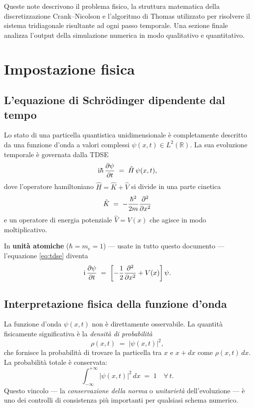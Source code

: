 \documentclass[12pt, a4paper]{article}
\newcommand{\ii}{\mathrm{i}}          %
\newcommand{\CN}{Crank--Nicolson}
\newcommand{\Htop}{\hat{H}}
\newcommand{\Ktop}{\hat{K}}
\newcommand{\Vtop}{\hat{V}}
\begin{document}
Queste note descrivono il problema fisico, la struttura matematica della
discretizzazione \CN{} e l'algoritmo di Thomas utilizzato per risolvere il
sistema tridiagonale risultante ad ogni passo temporale. Una sezione finale
analizza l'output della simulazione numerica in modo qualitativo e quantitativo.

\section{Impostazione fisica}

\subsection{L'equazione di Schr\"{o}dinger dipendente dal tempo}

Lo stato di una particella quantistica unidimensionale è completamente descritto
da una funzione d'onda a valori complessi $\psi(x,t) \in L^2(\mathbb{R})$.
La sua evoluzione temporale è governata dalla TDSE
\begin{equation}
  \ii\hbar\,\pdv{\psi}{t}(x,t) \;=\; \Htop\,\psi(x,t),
  \label{eq:tdse}
\end{equation}
dove l'operatore hamiltoniano $\Htop = \Ktop + \Vtop$ si divide in una
parte cinetica
\begin{equation}
  \Ktop \;=\; -\frac{\hbar^2}{2m}\pdv[2]{}{x}
\end{equation}
e un operatore di energia potenziale $\Vtop = V(x)$ che agisce in modo
moltiplicativo.

In \textbf{unità atomiche} ($\hbar = m_e = 1$) — usate in tutto questo
documento — l'equazione \eqref{eq:tdse} diventa
\begin{equation}
  \ii\,\pdv{\psi}{t} \;=\;
  \left[-\frac{1}{2}\pdv[2]{}{x} + V(x)\right]\psi.
  \label{eq:tdse_au}
\end{equation}

\subsection{Interpretazione fisica della funzione d'onda}

La funzione d'onda $\psi(x,t)$ non è direttamente osservabile. La quantità
fisicamente significativa è la \emph{densità di probabilità}
\begin{equation}
  \rho(x,t) \;=\; |\psi(x,t)|^2,
\end{equation}
che fornisce la probabilità di trovare la particella tra $x$ e $x+dx$
come $\rho(x,t)\,dx$. La probabilità totale è conservata:
\begin{equation}
  \int_{-\infty}^{+\infty} |\psi(x,t)|^2\,dx \;=\; 1
  \quad \forall\, t.
  \label{eq:norm}
\end{equation}
Questo vincolo — la \emph{conservazione della norma} o \emph{unitarietà}
dell'evoluzione — è uno dei controlli di consistenza più importanti per
qualsiasi schema numerico.
\end{document}
